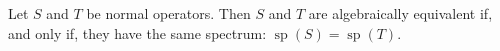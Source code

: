 Let $S$ and $T$ be normal operators. Then $S$ and $T$ are algebraically equivalent if, and only if, they have the same spectrum: $\operatorname{sp}(S) = \operatorname{sp}(T)$.

